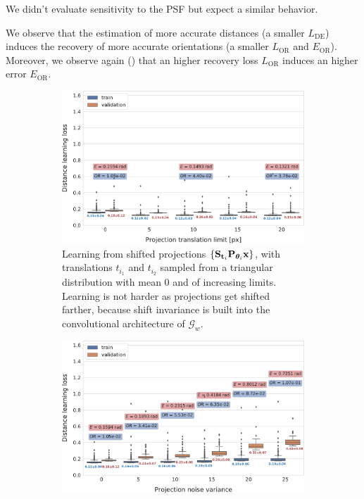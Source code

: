 We didn't evaluate sensitivity to the PSF but expect a similar behavior.

We observe that the estimation of more accurate distances (a smaller $L_\text{DE}$) induces the recovery of more accurate orientations (a smaller $L_\text{OR}$ and $E_\text{OR}$).
Moreover, we observe again () that an higher recovery loss $L_\text{OR}$ induces an higher error $E_\text{OR}$.

\begin{figure}[ht!]
    \centering
    \begin{subfigure}[t]{0.47\linewidth}
        \includegraphics[width=\linewidth]{figures/de_translation_nums}
        \caption{%
            Learning from shifted projections $\{ \mathbf{S}_{\mathbf{t}_i} \mathbf{P}_{{\boldsymbol{\theta}}_i} \mathbf{x} \}$, with translations $t_{i_1}$ and $t_{i_2}$ sampled from a triangular distribution with mean 0 and of increasing limits.
            Learning is not harder as projections get shifted farther, because shift invariance is built into the convolutional architecture of $\mathcal{G}_w$.
    }\label{fig:results:distance-estimation:shift}
    \end{subfigure}
    \hfill
    \begin{subfigure}[t]{0.47\linewidth}
        \includegraphics[width=\linewidth]{figures/de_noises_nums}

\end{subfigure}
\end{figure}
